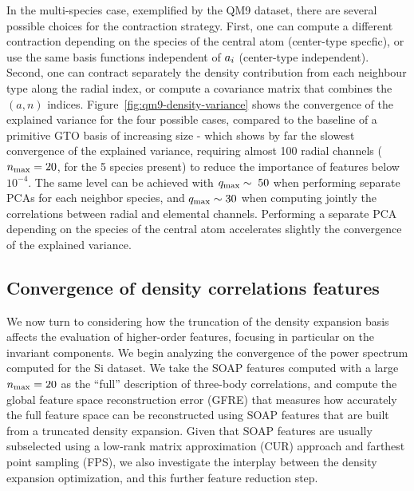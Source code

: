 In the multi-species case, exemplified by the QM9 dataset, there are several possible choices for the contraction strategy. First, one can compute a different contraction depending on the species of the central atom (center-type specfic), or use the same basis functions independent of $a_i$ (center-type independent). Second, one can contract separately the density contribution from each neighbour type along the radial index, or compute a covariance matrix that combines the $(a,n)$ indices. 
Figure~\ref{fig:qm9-density-variance} shows the convergence of the explained variance for the four possible cases, compared to the baseline of a primitive GTO basis of increasing size - which shows by far the slowest convergence of the explained variance, requiring almost 100 radial channels ($n_\mathrm{max}=20$, for the 5 species present) to reduce the importance of features below $10^{-4}$.
The same level can be achieved with $q_\mathrm{max}\sim\; 50$ when performing separate PCAs for each neighbor species, and $q_\mathrm{max}\sim 30$ when computing jointly the correlations between radial and elemental channels. 
Performing a separate PCA depending on the species of the central atom accelerates slightly the convergence of the explained variance.

\subsection{Convergence of density correlations features}

We now turn to considering how the truncation of the density expansion basis affects the evaluation of higher-order features, focusing in particular on the invariant components.
We begin analyzing the convergence of the power spectrum computed for the Si dataset. 
We take the SOAP features computed with a large $n_\mathrm{max}=20$ as the ``full'' description of three-body correlations, and compute the global feature space reconstruction error\cite{goscinski2021role} (GFRE) that measures how accurately the full feature space can be reconstructed using SOAP features that are built from a truncated density expansion. Given that SOAP features are usually subselected using a low-rank matrix approximation (CUR) approach\cite{imba+18jcp} and farthest point sampling (FPS)\cite{elda+97ieee,ceri+13jctc}, we also investigate the interplay between the density expansion optimization, and this further feature reduction step.

